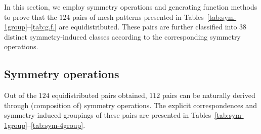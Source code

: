 \documentclass[10pt,a4paper]{article}
\begin{document}
In this section, we employ symmetry operations and generating function methods to prove that the $124$ pairs of mesh patterns presented in Tables~\ref{tab:sym-1group}--\ref{tab:g.f.} are equidistributed. These pairs are further classified into $38$ distinct symmetry-induced classes according to the corresponding symmetry operations.

\subsection{Symmetry operations}
Out of the $124$ equidistributed pairs obtained, $112$ pairs can be naturally derived through (composition of) symmetry operations. The explicit correspondences and symmetry-induced groupings of these pairs are presented in Tables~\ref{tab:sym-1group}--\ref{tab:sym-4group}.
\end{document}
